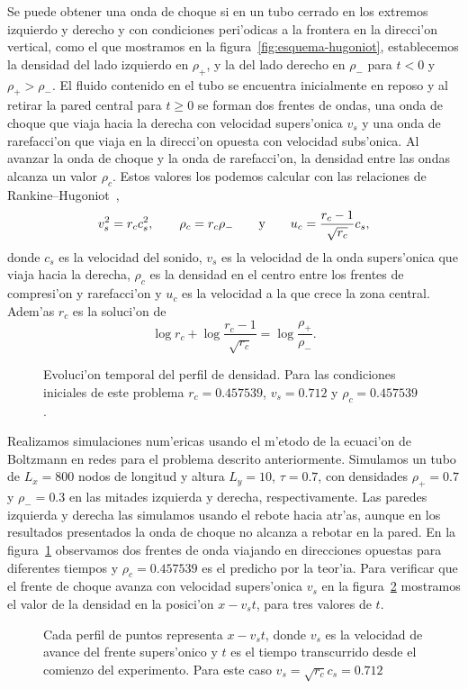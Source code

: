 Se puede obtener una onda de choque si en un tubo  cerrado en los extremos izquierdo y derecho y con
condiciones peri'odicas a la frontera en la direcci'on vertical, como el que mostramos
en la figura~\ref{fig:esquema-hugoniot},  establecemos la densidad 
del lado izquierdo en $\rho_+$, y la
del lado derecho en $\rho_-$ para $t<0$ y $\rho_+>\rho_-$. El fluido contenido en el tubo se encuentra
inicialmente en reposo y al retirar la pared central para $ t \geq 0$ 
se forman dos frentes de ondas, una onda de choque que viaja 
hacia la derecha con velocidad supers'onica $v_s$ y una onda de rarefacci'on que  
viaja en la direcci'on opuesta con velocidad subs'onica. 
Al avanzar la onda de choque y la onda de rarefacci'on,
la densidad entre las ondas alcanza un valor $\rho_c$. 
Estos valores los podemos calcular con las relaciones de Rankine--Hugoniot~\cite{ansumali00},
\begin{equation}
v_s^2 = r_cc_s^2, \qquad \rho_c = r_c\rho_- \qquad{\text y}\qquad u_c=\frac{r_c-1}{\sqrt{r_c}}c_s,
\end{equation}
donde $c_s$ es la velocidad del sonido, $v_s$ es la velocidad de la onda supers'onica que viaja
hacia la derecha, $\rho_c$ es la densidad en el centro entre los frentes de compresi'on
y rarefacci'on y $u_c$ es la velocidad a la que crece la zona central. Adem'as $r_c$ es la soluci'on de
\begin{equation} \label{ec:logr}
\log r_c + \log \frac{r_c-1}{\sqrt{r_c}} = \log \frac{\rho_+}{\rho_-}.
\end{equation}

\begin{figure}

\caption{\label{fig:rank-dens} Evoluci'on temporal del perfil de densidad. Para las condiciones
iniciales de este problema $r_c=0.457539$, $v_s = 0.712$ y $\rho_c=0.457539$ .}
\end{figure}

Realizamos simulaciones num'ericas usando el m'etodo de la ecuaci'on de Boltzmann
en redes para el problema descrito anteriormente. Simulamos un tubo  de $L_x= 800$ nodos
de longitud y altura $L_y=10$, $\tau=0.7$, con densidades $\rho_+=0.7$ y $\rho_-=0.3$ en las mitades izquierda
y derecha, respectivamente. Las paredes izquierda y derecha las simulamos usando el rebote hacia atr'as, aunque
en los resultados presentados la onda de choque no alcanza a rebotar en la pared.
En la figura~\ref{fig:rank-dens} observamos  dos frentes de onda viajando en direcciones opuestas  para 
diferentes tiempos y  $\rho_c=0.457539$ es el predicho
por la teor'ia. Para verificar que el frente de choque avanza con velocidad supers'onica $v_s$ 
en la figura~\ref{fig:rank-vs} mostramos  el valor de la densidad en la posici'on $x-v_st$, 
para tres valores de $t$. 
\begin{figure}

\caption{\label{fig:rank-vs} Cada perfil de puntos representa   $x - v_st$,
donde $v_s$ es la velocidad de avance del frente supers'onico
 y $t$ es  el tiempo transcurrido desde el comienzo del experimento. 
Para este caso $v_s=\sqrt{r_c}c_s=0.712$}
 \end{figure}





